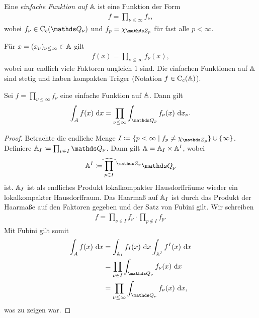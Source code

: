 \begin{defi}
Eine \emph{einfache Funktion auf $\mathbb{A}$} ist eine Funktion der Form
\begin{align*}
f=\prod_{\nu \leq \infty} f_\nu,
\end{align*}
wobei $f_\nu \in \CC_c(\Q_\nu)$ und $f_p=\chi_{\Z_p}$ für fast alle $p<\infty$.
\end{defi}


\begin{bem}
Für $x=(x_\nu)_{\nu \leq \infty}\in \mathbb{A}$ gilt
\begin{align*}
f(x)=\prod_{\nu \leq \infty} f_\nu(x),
\end{align*}
wobei nur endlich viele Faktoren ungleich $1$ sind.
Die einfachen Funktionen auf $\mathbb{A}$ sind stetig und haben kompakten Träger (Notation $f \in \mathrm{C}_c(\mathbb{A})$).
\end{bem}

\begin{prop}
Sei $f=\prod_{\nu \leq \infty} f_\nu$ eine einfache Funktion auf $\mathbb{A}$.
Dann gilt
\begin{align*}
\int_A f(x)~\mathrm{d}x=\prod_{\nu \leq \infty} \int_{\Q_p} f_\nu(x)~\mathrm{d}x_\nu.
\end{align*}
\end{prop}

\begin{proof}
Betrachte die endliche Menge $I \coloneqq \{p <\infty \mid f_p \not = \chi_{\Z_p}\} \cup \{\infty\}$.
Definiere $\A_I\coloneqq\prod_{\nu \in I}\Q_\nu$.
Dann gilt $\mathbb{A}=\mathbb{A}_I \times \mathbb{A}^I$, wobei
\begin{align*}
\A^I \coloneqq\widehat{\prod_{p \in I}}~\vphantom{\prod}^{\Z_p} \Q_p
\end{align*}
ist.
$\mathbb{A}_I$ ist als endliches Produkt lokalkompakter Hausdorffräume wieder ein lokalkompakter Hausdorffraum.
Das Haarmaß auf $\mathbb{A}_I$ ist durch das Produkt der Haarmaße auf den Faktoren gegeben und der Satz von Fubini gilt.
Wir schreiben
\begin{align*}
f=\prod_{\nu \in I} f_\nu \cdot \prod_{p \not \in I} f_p.
\end{align*}
Mit Fubini gilt somit
\begin{align*}
\int_Af(x)~\mathrm{d}x&=\int_{\A_I}f_I(x)~\mathrm{d}x \int_{\A^I}f^I(x)~\mathrm{d}x\\
&=\prod_{\nu \in I} \int_{\Q_\nu} f_\nu(x)~\mathrm{d}x\\
&=\prod_{\nu \leq \infty} \int_{\Q_\nu} f_\nu(x)~\mathrm{d}x,
\end{align*}
was zu zeigen war.
\end{proof}


